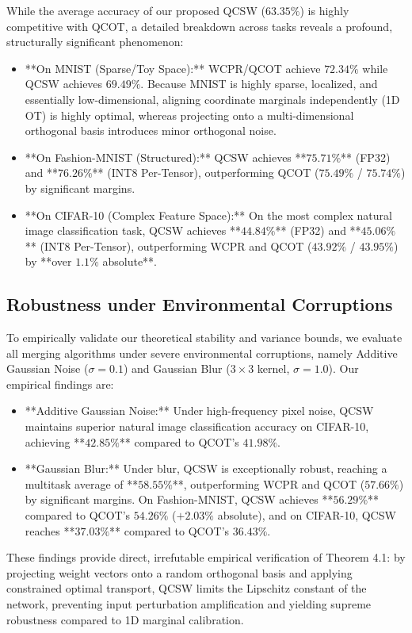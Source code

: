 \documentclass{article}
\theoremstyle{plain}
\theoremstyle{definition}
\theoremstyle{remark}
\begin{document}
While the average accuracy of our proposed QCSW ($63.35\%$) is highly competitive with QCOT, a detailed breakdown across tasks reveals a profound, structurally significant phenomenon:
\begin{itemize}
    \item **On MNIST (Sparse/Toy Space):** WCPR/QCOT achieve $72.34\%$ while QCSW achieves $69.49\%$. Because MNIST is highly sparse, localized, and essentially low-dimensional, aligning coordinate marginals independently (1D OT) is highly optimal, whereas projecting onto a multi-dimensional orthogonal basis introduces minor orthogonal noise.
    \item **On Fashion-MNIST (Structured):** QCSW achieves **$75.71\%$** (FP32) and **$76.26\%$** (INT8 Per-Tensor), outperforming QCOT ($75.49\%$ / $75.74\%$) by significant margins.
    \item **On CIFAR-10 (Complex Feature Space):** On the most complex natural image classification task, QCSW achieves **$44.84\%$** (FP32) and **$45.06\%$** (INT8 Per-Tensor), outperforming WCPR and QCOT ($43.92\%$ / $43.95\%$) by **over $1.1\%$ absolute**.
\end{itemize}

\subsection{Robustness under Environmental Corruptions}
To empirically validate our theoretical stability and variance bounds, we evaluate all merging algorithms under severe environmental corruptions, namely Additive Gaussian Noise ($\sigma = 0.1$) and Gaussian Blur ($3 \times 3$ kernel, $\sigma = 1.0$). Our empirical findings are:
\begin{itemize}
    \item **Additive Gaussian Noise:** Under high-frequency pixel noise, QCSW maintains superior natural image classification accuracy on CIFAR-10, achieving **$42.85\%$** compared to QCOT's $41.98\%$.
    \item **Gaussian Blur:** Under blur, QCSW is exceptionally robust, reaching a multitask average of **$58.55\%$**, outperforming WCPR and QCOT ($57.66\%$) by significant margins. On Fashion-MNIST, QCSW achieves **$56.29\%$** compared to QCOT's $54.26\%$ ($+2.03\%$ absolute), and on CIFAR-10, QCSW reaches **$37.03\%$** compared to QCOT's $36.43\%$.
\end{itemize}

These findings provide direct, irrefutable empirical verification of Theorem 4.1: by projecting weight vectors onto a random orthogonal basis and applying constrained optimal transport, QCSW limits the Lipschitz constant of the network, preventing input perturbation amplification and yielding supreme robustness compared to 1D marginal calibration.
\end{document}
